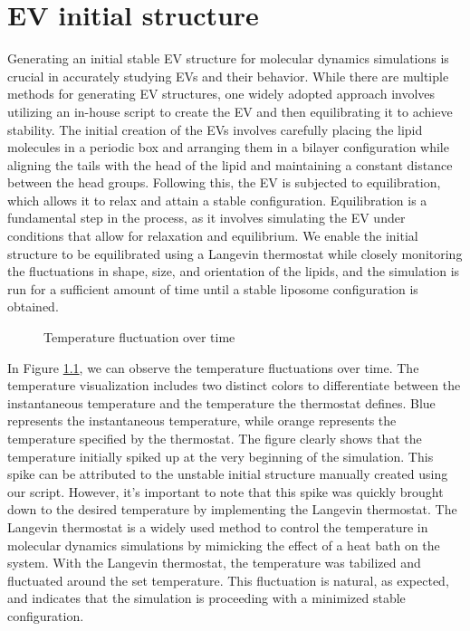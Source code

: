 \chapter{EV initial structure}\label{appendix:A}

Generating an initial stable EV structure for molecular dynamics simulations is crucial in accurately studying EVs and their behavior. While there are multiple methods for generating EV structures, one widely adopted approach involves utilizing an in-house script to create the EV and then equilibrating it to achieve stability. The initial creation of the EVs involves carefully placing the lipid molecules in a periodic box and arranging them in a bilayer configuration while aligning the tails with the head of the lipid and maintaining a constant distance between the head groups. Following this, the EV is subjected to equilibration, which allows it to relax and attain a stable configuration. Equilibration is a fundamental step in the process, as it involves simulating the EV under conditions that allow for relaxation and equilibrium. We enable the initial structure to be equilibrated using a Langevin thermostat while closely monitoring the fluctuations in shape, size, and orientation of the lipids, and the simulation is run for a sufficient amount of time until a stable liposome configuration is obtained.

\begin{figure}[htbp]
  \centering
  
  \vspace{0.5cm}
  \caption{Temperature fluctuation over time}
  \label{A:1}
\end{figure}

In Figure \ref{A:1}, we can observe the temperature fluctuations over time. The temperature visualization includes two distinct colors to differentiate between the instantaneous temperature and the temperature the thermostat defines. Blue represents the instantaneous temperature, while orange represents the temperature specified by the thermostat. The figure clearly shows that the temperature initially spiked up at the very beginning of the simulation. This spike can be attributed to the unstable initial structure manually created using our script. However, it's important to note that this spike was quickly brought down to the desired temperature by implementing the Langevin thermostat. The Langevin thermostat is a widely used method to control the temperature in molecular dynamics simulations by mimicking the effect of a heat bath on the system. With the Langevin thermostat, the temperature was tabilized and fluctuated around the set temperature. This fluctuation is natural, as expected, and indicates that the simulation is proceeding with a minimized stable configuration.

